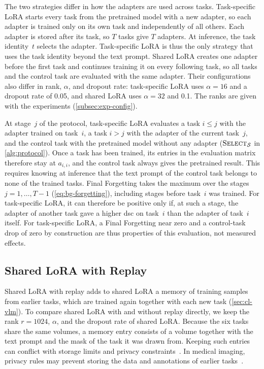 The two strategies differ in how the adapters are used across tasks.
Task-specific LoRA starts every task from the pretrained model with a new adapter, so each adapter is trained only on its own task and independently of all others.
Each adapter is stored after its task, so $T$ tasks give $T$ adapters.
At inference, the task identity~$t$ selects the adapter.
Task-specific LoRA is thus the only strategy that uses the task identity beyond the text prompt.
Shared LoRA creates one adapter before the first task and continues training it on every following task, so all tasks and the control task are evaluated with the same adapter.
Their configurations also differ in rank, $\alpha$, and dropout rate: task-specific LoRA uses $\alpha = 16$ and a dropout rate of 0.05, and shared LoRA uses $\alpha = 32$ and 0.1.
The ranks are given with the experiments (\cref{subsec:exp-config}).

At stage~$j$ of the protocol, task-specific LoRA evaluates a task $i \le j$ with the adapter trained on task~$i$, a task $i > j$ with the adapter of the current task~$j$, and the control task with the pretrained model without any adapter ($\textsc{Select}_{\mathcal{S}}$ in \cref{alg:protocol}).
Once a task has been trained, its entries in the evaluation matrix therefore stay at $a_{i,i}$, and the control task always gives the pretrained result.
This requires knowing at inference that the text prompt of the control task belongs to none of the trained tasks.
Final Forgetting takes the maximum over the stages $j = 1, \dots, T-1$ (\cref{eq:bg-forgetting}), including stages before task~$i$ was trained.
For task-specific LoRA, it can therefore be positive only if, at such a stage, the adapter of another task gave a higher \gls{dsc} on task~$i$ than the adapter of task~$i$ itself.
For task-specific LoRA, a Final Forgetting near zero and a control-task drop of zero by construction are thus properties of this evaluation, not measured effects.

\subsection{Shared LoRA with Replay}
\label{subsec:method-replay}

Shared LoRA with replay adds to shared LoRA a memory of training samples from earlier tasks, which are trained again together with each new task (\cref{sec:cl-vlm}).
To compare shared LoRA with and without replay directly, we keep the rank $r = 1024$, $\alpha$, and the dropout rate of shared LoRA.
Because the six tasks share the same volumes, a memory entry consists of a volume together with the text prompt and the mask of the task it was drawn from.
Keeping such entries can conflict with storage limits and privacy constraints~\cite[Sec.~1]{delange2022}.
In medical imaging, privacy rules may prevent storing the data and annotations of earlier tasks~\cite{zhang2023continuallearningabdominalmultiorgan}.

